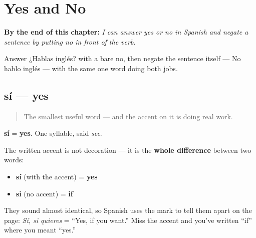 
\chapter{Yes and No}
\label{ch:spanish-basic-responses}

\begin{chapteropening}
\textbf{By the end of this chapter:} \emph{I can answer yes or no in Spanish and negate a sentence by putting no in front of the verb.}

Answer ¿Hablas inglés? with a bare no, then negate the sentence itself — No hablo inglés — with the same one word doing both jobs.
\end{chapteropening}

\section[sí]{sí — yes}

\label{lesson:ES-C19-si}



\begin{quote}
The smallest useful word — and the accent on it is doing real work.
\end{quote}

\begin{cousinweb}
\textbf{sí} = \textbf{yes}. One syllable, said \emph{see}.

The written accent is not decoration — it is the \textbf{whole difference} between two words:

\begin{itemize}
\raggedright
  \item \textbf{sí} (with the accent) = \textbf{yes}
  \item \textbf{si} (no accent) = \textbf{if}
\end{itemize}

They sound almost identical, so Spanish uses the mark to tell them apart on the page: \emph{Sí, si quieres} = \textquotedblleft{}Yes, if you want.\textquotedblright{} Miss the accent and you've written \textquotedblleft{}if\textquotedblright{} where you meant \textquotedblleft{}yes.\textquotedblright{}
\end{cousinweb}


